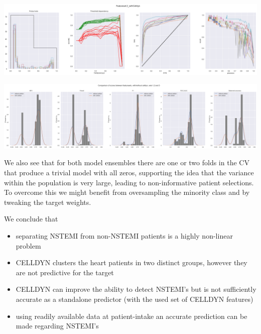 \documentclass[a4paper,10pt]{article}
\begin{document}
\begin{center}
 \includegraphics[bb=0 0 1710 478,scale=0.2,keepaspectratio=true]{images/metric_plots_set2_ensemble_1.png}
\end{center}
%
%
\begin{center}
 \includegraphics[bb=0 0 2062 526,scale=0.2,keepaspectratio=true]{images/metric_distro_ensemble_1.png}
\end{center}

%
We also see that for both model ensembles there are one or two folds in the CV that produce a 
trivial model with all zeros, supporting the idea that the variance within the population is very large, 
leading to non-informative patient selections. To overcome this we might benefit from oversampling the minority class and by tweaking the target weights.

%
We conclude that 
\begin{itemize}
\item separating NSTEMI from non-NSTEMI patients is a highly non-linear problem 
\item CELLDYN clusters the heart patients in two distinct groups, however they are not predictive for the target
\item CELLDYN can improve the ability to detect NSTEMI's but is not sufficiently accurate as a standalone predictor (with the used set of CELLDYN features) 
\item using readily available data at patient-intake an accurate prediction can be made regarding NSTEMI's
\end{itemize}
\end{document}
